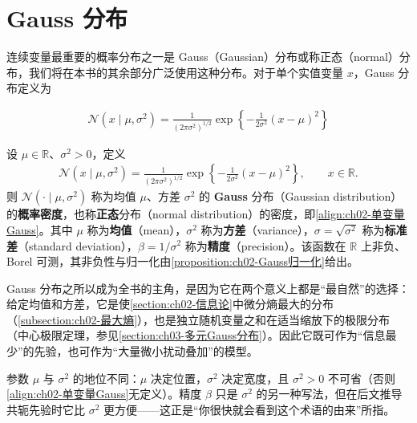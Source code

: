 \documentclass[../../main.tex]{subfiles}
\begin{document}
\section{Gauss 分布}\label{section:ch02-Gauss分布}

连续变量最重要的概率分布之一是 Gauss（Gaussian）分布或称正态（normal）分布，我们将在本书的其余部分广泛使用这种分布。对于单个实值变量 $x$，Gauss 分布定义为

\begin{align}
  \mathcal{N}(x\mid\mu,\sigma^{2}) = \frac{1}{(2\pi\sigma^{2})^{1/2}}\exp\left\{-\frac{1}{2\sigma^{2}}(x-\mu)^{2}\right\}
  \label{align:ch02-单变量Gauss}
\end{align}

\begin{definition}[Gauss 分布]\label{definition:ch02-Gauss分布}
设 $\mu\in\mathbb{R}$、$\sigma^{2}>0$，定义
\begin{align*}
  \mathcal{N}(x\mid\mu,\sigma^{2})=\frac{1}{(2\pi\sigma^{2})^{1/2}}\exp\left\{-\frac{1}{2\sigma^{2}}(x-\mu)^{2}\right\},\qquad x\in\mathbb{R}.
\end{align*}
则 $\mathcal{N}(\cdot\mid\mu,\sigma^{2})$ 称为均值 $\mu$、方差 $\sigma^{2}$ 的 \textbf{Gauss} 分布（Gaussian distribution）的\textbf{概率密度}，也称\textbf{正态}分布（normal distribution）的密度，即\eqref{align:ch02-单变量Gauss}。其中 $\mu$ 称为\textbf{均值}（mean），$\sigma^{2}$ 称为\textbf{方差}（variance），$\sigma=\sqrt{\sigma^{2}}$ 称为\textbf{标准差}（standard deviation），$\beta=1/\sigma^{2}$ 称为\textbf{精度}（precision）。该函数在 $\mathbb{R}$ 上非负、Borel 可测，其非负性与归一化由\cref{proposition:ch02-Gauss归一化}给出。
\end{definition}

\begin{remark}
Gauss 分布之所以成为全书的主角，是因为它在两个意义上都是“最自然”的选择：给定均值和方差，它是使\cref{section:ch02-信息论}中微分熵最大的分布（\cref{subsection:ch02-最大熵}），也是独立随机变量之和在适当缩放下的极限分布（中心极限定理，参见\cref{section:ch03-多元Gauss分布}）。因此它既可作为“信息最少”的先验，也可作为“大量微小扰动叠加”的模型。

参数 $\mu$ 与 $\sigma^{2}$ 的地位不同：$\mu$ 决定位置，$\sigma^{2}$ 决定宽度，且 $\sigma^{2}>0$ 不可省（否则\eqref{align:ch02-单变量Gauss}无定义）。精度 $\beta$ 只是 $\sigma^{2}$ 的另一种写法，但在后文推导共轭先验时它比 $\sigma^{2}$ 更方便——这正是“你很快就会看到这个术语的由来”所指。
\end{remark}
\end{document}
